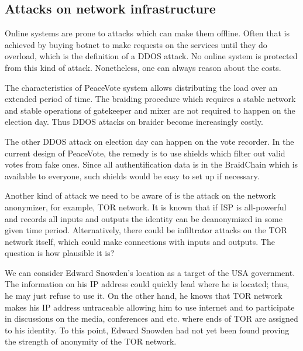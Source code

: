 \documentclass[12pt,a4paper]{article}
\let\Oldsubsection\subsection
\renewcommand{\subsection}{\FloatBarrier\Oldsubsection}
\begin{document}
\subsection{Attacks on network infrastructure}
Online systems are prone to attacks which can make them offline. Often that is achieved by buying botnet to make requests on the services until they do overload, which is the definition of a DDOS attack. No online system is protected from this kind of attack. Nonetheless, one can always reason about the costs.\par
The characteristics of PeaceVote system allows distributing the load over an extended period of time. The braiding procedure which requires a stable network and stable operations of gatekeeper and mixer are not required to happen on the election day. Thus DDOS attacks on braider become increasingly costly.\par
The other DDOS attack on election day can happen on the vote recorder. In the current design of PeaceVote, the remedy is to use shields which filter out valid votes from fake ones. Since all authentification data is in the BraidChain which is available to everyone, such shields would be easy to set up if necessary.\par
Another kind of attack we need to be aware of is the attack on the network anonymizer, for example, TOR network. It is known that if ISP is all-powerful and records all inputs and outputs the identity can be deanonymized in some given time period. Alternatively, there could be infiltrator attacks on the TOR network itself, which could make connections with inputs and outputs. The question is how plausible it is?\par
We can consider Edward Snowden's location as a target of the USA government. The information on his IP address could quickly lead where he is located; thus, he may just refuse to use it. On the other hand, he knows that TOR network makes his IP address untraceable allowing him to use internet and to participate in discussions on the media, conferences and etc. where ends of TOR are assigned to his identity. To this point, Edward Snowden had not yet been found proving the strength of anonymity of the TOR network.\par
\end{document}
